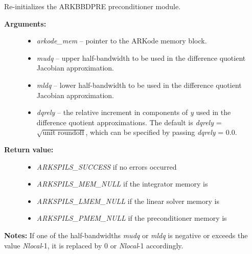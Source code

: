 \documentclass[letterpaper,10pt,english]{sphinxmanual}
\begin{document}
\begin{fulllineitems}
\label{c_interface/Preconditioners:ARKBBDPrecReInit}
Re-initializes the ARKBBDPRE preconditioner module.
\begin{description}
\item[{\textbf{Arguments:}}] \leavevmode\begin{itemize}
\item {} 
\emph{arkode\_mem} -- pointer to the ARKode memory block.

\item {} 
\emph{mudq} -- upper half-bandwidth to be used in the difference
quotient Jacobian approximation.

\item {} 
\emph{mldq} -- lower half-bandwidth to be used in the difference
quotient Jacobian approximation.

\item {} 
\emph{dqrely} -- the relative increment in components of \emph{y} used in
the difference quotient approximations.  The default is \emph{dqrely}
= $\sqrt{\text{unit roundoff}}$, which can be specified by
passing \emph{dqrely} = 0.0.

\end{itemize}

\item[{\textbf{Return value:}}] \leavevmode\begin{itemize}
\item {} 
\emph{ARKSPILS\_SUCCESS} if no errors occurred

\item {} 
\emph{ARKSPILS\_MEM\_NULL} if the integrator memory is 

\item {} 
\emph{ARKSPILS\_LMEM\_NULL} if the linear solver memory is 

\item {} 
\emph{ARKSPILS\_PMEM\_NULL} if the preconditioner memory is 

\end{itemize}

\end{description}

\textbf{Notes:}  If one of the half-bandwidths \emph{mudq} or \emph{mldq} is
negative or exceeds the value \emph{Nlocal}-1, it is replaced by 0 or
\emph{Nlocal}-1 accordingly.

\end{fulllineitems}
\end{document}
